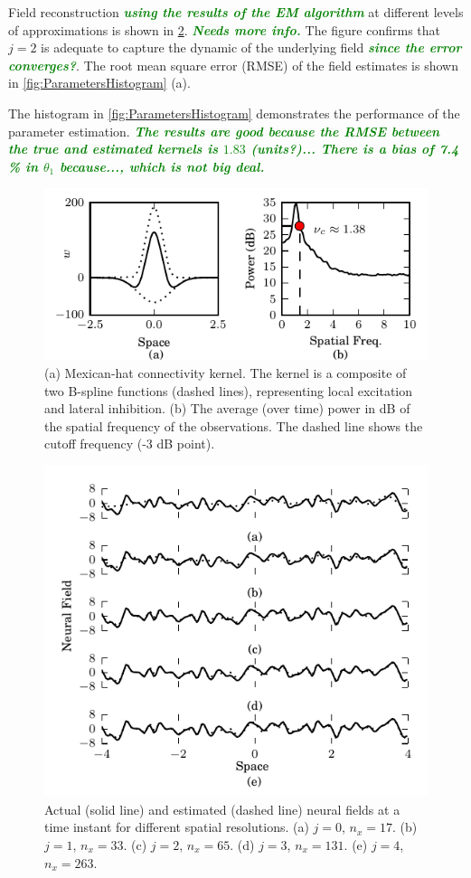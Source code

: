 \documentclass[journal,a4paper]{IEEEtran}
\newcommand{\dean}[1]{\textsf{\emph{\textbf{\textcolor{green}{#1}}}}}
\begin{document}
Field reconstruction \dean{using the results of the EM algorithm} at different levels of approximations is shown in \figurename{\ref{fig:FieldEstimates}}. \dean{Needs more info.} The figure confirms that $j=2$ is adequate to capture the dynamic of the underlying field \dean{since the error converges?}. The root mean square error (RMSE) of the field estimates is shown in \figurename{\ref{fig:ParametersHistogram}} (a). 

The histogram in \figurename{\ref{fig:ParametersHistogram}} demonstrates the performance of the parameter estimation. \dean{The results are good because the RMSE between the true and estimated kernels is $1.83$ (units?)... There is a bias of 7.4 \% in $\theta_1$ because..., which is not big deal.}
\begin{figure}[!h]
 \centering
 \includegraphics[scale=1]{./Graph/ObservationFreqResponse.pdf}
 \caption{(a) Mexican-hat connectivity kernel. The kernel is a composite of two B-spline
functions (dashed lines), representing local excitation and lateral inhibition. (b) The average (over time) power in dB of the spatial frequency of the observations. The dashed line shows the cutoff frequency (-3 dB point).}
\label{fig:KernelAndFreqResponse} 
  \end{figure} 
\begin{figure}[!h] 
 \centering
 \includegraphics[scale=1]{./Graph/Field.pdf}
 \caption{Actual (solid line) and estimated (dashed line) neural fields at a time instant for different spatial resolutions. (a) $j=0$, $n_x=17$. (b) $j=1$, $n_x=33$. (c) $j=2$, $n_x=65$. (d) $j=3$, $n_x=131$. (e) $j=4$, $n_x=263$.}
 \label{fig:FieldEstimates}
 \end{figure} 
\end{document}
